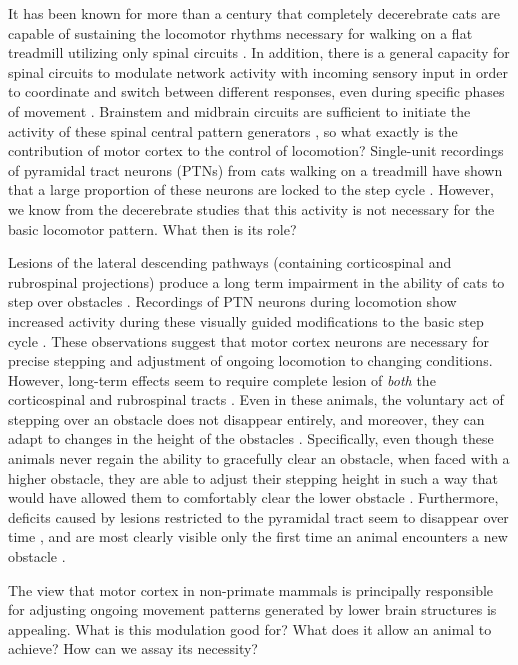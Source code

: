 It has been known for more than a century that completely decerebrate cats are capable of sustaining the locomotor rhythms necessary for walking on a flat treadmill utilizing only spinal circuits \cite{GrahamBrown1911}. In addition, there is a general capacity for spinal circuits to modulate network activity with incoming sensory input in order to coordinate and switch between different responses, even during specific phases of movement \cite{Forssberg1975}. Brainstem and midbrain circuits are sufficient to initiate the activity of these spinal central pattern generators \cite{Grillner1973}, so what exactly is the contribution of motor cortex to the control of locomotion? Single-unit recordings of pyramidal tract neurons (PTNs) from cats walking on a treadmill have shown that a large proportion of these neurons are locked to the step cycle \cite{Armstrong1984a}. However, we know from the decerebrate studies that this activity is not necessary for the basic locomotor pattern. What then is its role?

Lesions of the lateral descending pathways (containing corticospinal and rubrospinal projections) produce a long term impairment in the ability of cats to step over obstacles \cite{Drew2002}. Recordings of PTN neurons during locomotion show increased activity during these visually guided modifications to the basic step cycle \cite{Drew1996}. These observations suggest that motor cortex neurons are necessary for precise stepping and adjustment of ongoing locomotion to changing conditions. However, long-term effects seem to require complete lesion of \emph{both} the corticospinal and rubrospinal tracts \cite{Drew2002}. Even in these animals, the voluntary act of stepping over an obstacle does not disappear entirely, and moreover, they can adapt to changes in the height of the obstacles \cite{Drew2002}. Specifically, even though these animals never regain the ability to gracefully clear an obstacle, when faced with a higher obstacle, they are able to adjust their stepping height in such a way that would have allowed them to comfortably clear the lower obstacle \cite{Drew2002}. Furthermore, deficits caused by lesions restricted to the pyramidal tract seem to disappear over time \cite{Liddell1944}, and are most clearly visible only the first time an animal encounters a new obstacle \cite{Liddell1944}.

The view that motor cortex in non-primate mammals is principally responsible for adjusting ongoing movement patterns generated by lower brain structures is appealing. What is this modulation good for? What does it allow an animal to achieve? How can we assay its necessity?

